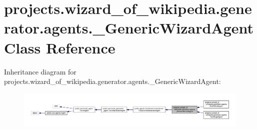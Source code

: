 \hypertarget{classprojects_1_1wizard__of__wikipedia_1_1generator_1_1agents_1_1__GenericWizardAgent}{}\section{projects.\+wizard\+\_\+of\+\_\+wikipedia.\+generator.\+agents.\+\_\+\+Generic\+Wizard\+Agent Class Reference}
\label{classprojects_1_1wizard__of__wikipedia_1_1generator_1_1agents_1_1__GenericWizardAgent}


Inheritance diagram for projects.\+wizard\+\_\+of\+\_\+wikipedia.\+generator.\+agents.\+\_\+\+Generic\+Wizard\+Agent\+:
\nopagebreak
\begin{figure}[H]
\begin{center}
\leavevmode
\includegraphics[width=350pt]{d5/df6/classprojects_1_1wizard__of__wikipedia_1_1generator_1_1agents_1_1__GenericWizardAgent__inherit__graph}
\end{center}
\end{figure}


